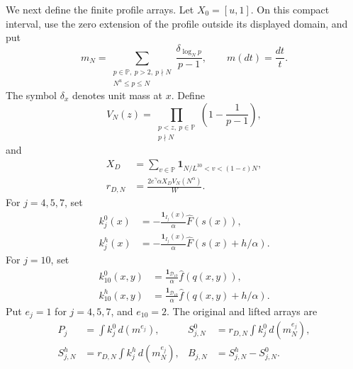 We next define the finite profile arrays.
Let $X_0=[u,1]$. On this compact interval, use the zero extension of the
profile outside its displayed domain, and put
\begin{equation}\label{eq:retB-measure}
 m_N=\sum_{\substack{p\in\mathbb P,\ p>2,\ p\nmid N\\N^u\le p\le N}}
       \frac{\delta_{\log_Np}}{p-1},\qquad m(dt)=\frac{dt}{t}.
\end{equation}
The symbol $\delta_x$ denotes unit mass at $x$.
Define
\begin{equation}\label{eq:retB-Euler}
 V_N(z)=\prod_{\substack{p<z,\ p\in\mathbb P\\p\nmid N}}
           \left(1-\frac1{p-1}\right),
\end{equation}
and
\begin{equation}\label{eq:retB-direct-normalization}
\begin{aligned}
 X_D&=\sum_{v\in\mathbb P}
        \mathbf1_{N/L^{30}<v<(1-\varepsilon)N},\\
 r_{D,N}&=\frac{2e^\gamma\alpha X_DV_N(N^\alpha)}{W}.
\end{aligned}
\end{equation}
For $j=4,5,7$, set
\begin{equation}\label{eq:retB-direct-base-kernels}
\begin{aligned}
 k_j^0(x)&=-\frac{\mathbf1_{I_j}(x)}{\alpha}\widehat F(s(x)),\\
 k_j^h(x)&=-\frac{\mathbf1_{I_j}(x)}{\alpha}
                       \widehat F(s(x)+h/\alpha).
\end{aligned}
\end{equation}
For $j=10$, set
\begin{equation}\label{eq:retB-pair-base-kernels}
\begin{aligned}
 k_{10}^0(x,y)&=\frac{\mathbf1_{\mathcal D_{10}}}{\alpha}\widehat f(q(x,y)),\\
 k_{10}^h(x,y)&=\frac{\mathbf1_{\mathcal D_{10}}}{\alpha}
                            \widehat f(q(x,y)+h/\alpha).
\end{aligned}
\end{equation}
Put $e_j=1$ for $j=4,5,7$, and $e_{10}=2$.
The original and lifted arrays are
\begin{equation}\label{eq:retB-direct-arrays}
\begin{aligned}
 P_j&=\int k_j^0\,d(m^{e_j}),&
 S_{j,N}^0&=r_{D,N}\int k_j^0\,d(m_N^{e_j}),\\
 S_{j,N}^h&=r_{D,N}\int k_j^h\,d(m_N^{e_j}),&
 B_{j,N}&=S_{j,N}^h-S_{j,N}^0.
\end{aligned}
\end{equation}
